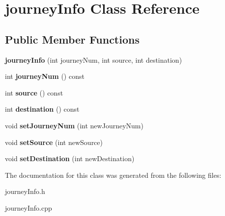 \hypertarget{classjourneyInfo}{
\section{journeyInfo Class Reference}
\label{classjourneyInfo}
}
\subsection*{Public Member Functions}
\begin{DoxyCompactItemize}
\item 
\hypertarget{classjourneyInfo_a1b8b84da7773d80232f6f56cffc37a63}{
{\bfseries journeyInfo} (int journeyNum, int source, int destination)}
\label{classjourneyInfo_a1b8b84da7773d80232f6f56cffc37a63}

\item 
\hypertarget{classjourneyInfo_ac28428cd2fe309572473589711aeb22d}{
int {\bfseries journeyNum} () const }
\label{classjourneyInfo_ac28428cd2fe309572473589711aeb22d}

\item 
\hypertarget{classjourneyInfo_a346f8062e92ec18e9230ea6797c15992}{
int {\bfseries source} () const }
\label{classjourneyInfo_a346f8062e92ec18e9230ea6797c15992}

\item 
\hypertarget{classjourneyInfo_a9c6b2a873de0fa5e04daf7eb6b0a75a1}{
int {\bfseries destination} () const }
\label{classjourneyInfo_a9c6b2a873de0fa5e04daf7eb6b0a75a1}

\item 
\hypertarget{classjourneyInfo_aba07dd9bb990ca6c5d4684870adfea13}{
void {\bfseries setJourneyNum} (int newJourneyNum)}
\label{classjourneyInfo_aba07dd9bb990ca6c5d4684870adfea13}

\item 
\hypertarget{classjourneyInfo_aebd1cd95efe5d8e167af32752e0c12d8}{
void {\bfseries setSource} (int newSource)}
\label{classjourneyInfo_aebd1cd95efe5d8e167af32752e0c12d8}

\item 
\hypertarget{classjourneyInfo_a911c161a3819dab805d863fbde3b6aee}{
void {\bfseries setDestination} (int newDestination)}
\label{classjourneyInfo_a911c161a3819dab805d863fbde3b6aee}

\end{DoxyCompactItemize}


The documentation for this class was generated from the following files:\begin{DoxyCompactItemize}
\item 
journeyInfo.h\item 
journeyInfo.cpp\end{DoxyCompactItemize}
